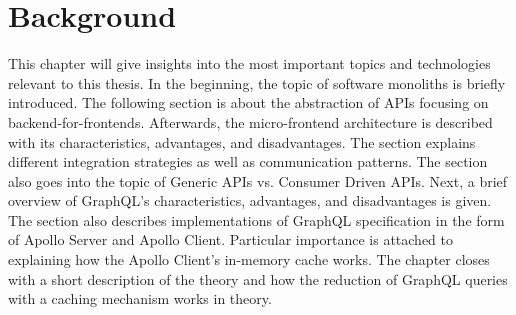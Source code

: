 \chapter{Background}\label{chapter:background}

This chapter will give insights into the most important topics and technologies relevant to this thesis. In the beginning, the topic of software monoliths is briefly introduced. The following section is about the abstraction of APIs focusing on backend-for-frontends. Afterwards, the micro-frontend architecture is described with its characteristics, advantages, and disadvantages. The section explains different integration strategies as well as communication patterns. The section also goes into the topic of Generic APIs vs. Consumer Driven APIs. Next, a brief overview of GraphQL's characteristics, advantages, and disadvantages is given. The section also describes implementations of GraphQL specification in the form of Apollo Server and Apollo Client. Particular importance is attached to explaining how the Apollo Client's in-memory cache works. The chapter closes with a short description of the theory and how the reduction of GraphQL queries with a caching mechanism works in theory.










